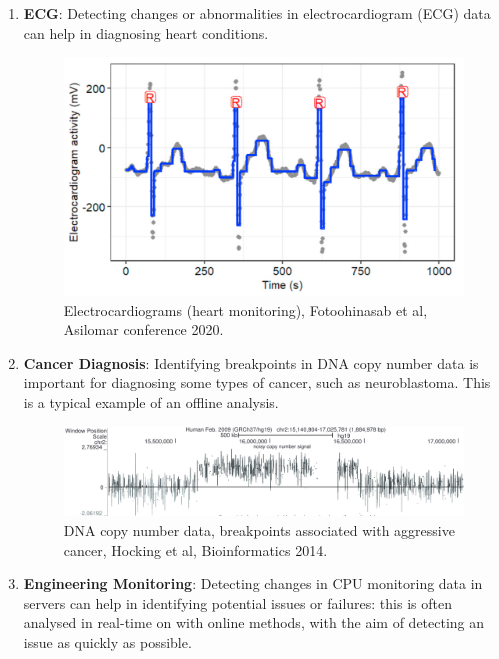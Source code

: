 \documentclass[
  letterpaper,
  DIV=11,
  numbers=noendperiod]{scrreprt}
\begin{document}
\begin{enumerate}
\def\labelenumi{\arabic{enumi}.}
\item
  \textbf{ECG}: Detecting changes or abnormalities in electrocardiogram
  (ECG) data can help in diagnosing heart conditions.

  \begin{figure}[H]

  {\centering \includegraphics{source_imgs/intro-ecg.png}

  }

  \caption{Electrocardiograms (heart monitoring), Fotoohinasab et al,
  Asilomar conference 2020.}

  \end{figure}%
\item
  \textbf{Cancer Diagnosis}: Identifying breakpoints in DNA copy number
  data is important for diagnosing some types of cancer, such as
  neuroblastoma. This is a typical example of an offline analysis.

  \begin{figure}[H]

  {\centering \includegraphics{source_imgs/intro-breakpoints.png}

  }

  \caption{DNA copy number data, breakpoints associated with aggressive
  cancer, Hocking et al, Bioinformatics 2014.}

  \end{figure}%
\item
  \textbf{Engineering Monitoring}: Detecting changes in CPU monitoring
  data in servers can help in identifying potential issues or failures:
  this is often analysed in real-time on with online methods, with the
  aim of detecting an issue as quickly as possible.


\end{enumerate}
\end{document}
